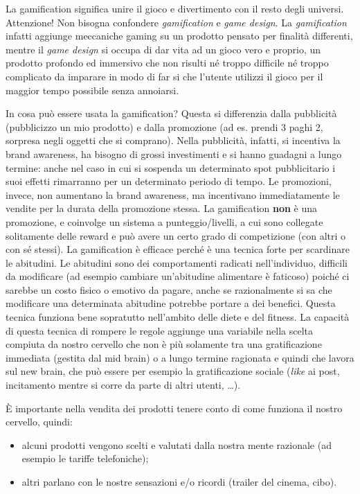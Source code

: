 La gamification significa unire il gioco e divertimento con il resto degli
universi. Attenzione! Non bisogna confondere \emph{gamification} e \emph{game
design}. La \emph{gamification} infatti aggiunge meccaniche gaming su un
prodotto pensato per finalità differenti, mentre il \textit{game design} si
occupa di dar vita ad un gioco vero e proprio, un prodotto profondo ed
immersivo che non risulti né troppo difficile né troppo complicato da imparare
in modo di far si che l'utente utilizzi il gioco per il maggior tempo possibile
senza annoiarsi.

In cosa può essere usata la gamification? Questa si differenzia dalla
pubblicità (pubblicizzo un mio prodotto) e dalla promozione (ad es. prendi 3
paghi 2, sorpresa negli oggetti che si comprano). Nella pubblicità, infatti, si
incentiva la brand awareness, ha bisogno di grossi investimenti e si hanno
guadagni a lungo termine: anche nel caso in cui si sospenda un determinato spot
pubblicitario i suoi effetti rimarranno per un determinato periodo di tempo. Le
promozioni, invece, non aumentano la brand awareness, ma incentivano
immediatamente le vendite per la durata della promozione stessa. La
gamification \textbf{non} è una promozione, e coinvolge un sistema a
punteggio/livelli, a cui sono collegate solitamente delle reward e può avere un
certo grado di competizione (con altri o con sé stessi).
La gamification è efficace perché è una tecnica forte per scardinare le
abitudini. Le abitudini sono dei comportamenti radicati nell'individuo,
difficili da modificare (ad esempio cambiare un'abitudine alimentare è
faticoso) poiché ci sarebbe un costo fisico o emotivo da pagare, anche se
razionalmente si sa che modificare una determinata abitudine potrebbe portare a
dei benefici. Questa tecnica funziona bene sopratutto nell'ambito delle diete e
del fitness. La capacità di questa tecnica di rompere le regole aggiunge una
variabile nella scelta compiuta da nostro cervello che non è più solamente tra
una gratificazione immediata (gestita dal mid brain) o a lungo termine 
ragionata e quindi che lavora sul new brain, che può essere per esempio la
gratificazione sociale (\emph{like} ai post, incitamento mentre si corre da
parte di altri utenti, \dots{}).

È importante nella vendita dei prodotti tenere conto di come funziona il nostro
cervello, quindi:

\begin{itemize}
 \item alcuni prodotti vengono scelti e valutati dalla nostra mente razionale
 (ad esempio le tariffe telefoniche);
 \item altri parlano con le nostre sensazioni e/o ricordi (trailer del cinema,
 cibo).
\end{itemize}

